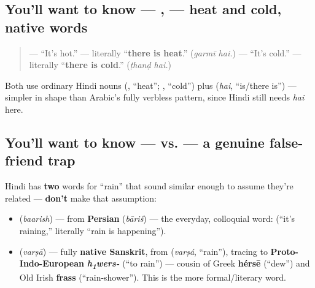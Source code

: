 \subsection*{You'll want to know —  ,   — heat and cold, native words}
\begin{quote}
\textbf{ } — \textquotedblleft{}It's hot.\textquotedblright{} — literally \textquotedblleft{}\textbf{there is heat}.\textquotedblright{} (\emph{garmī hai.}) \textbf{ } — \textquotedblleft{}It's cold.\textquotedblright{} — literally \textquotedblleft{}\textbf{there is cold}.\textquotedblright{} (\emph{ṭhanḍ hai.})
\end{quote}

Both use ordinary Hindi nouns (\textbf{}, \textquotedblleft{}heat\textquotedblright{}; \textbf{}, \textquotedblleft{}cold\textquotedblright{}) plus \textbf{} (\emph{hai}, \textquotedblleft{}is/there is\textquotedblright{}) — simpler in shape than Arabic's fully verbless pattern, since Hindi still needs \emph{hai} here.

\subsection*{You'll want to know —  vs.  — a genuine false-friend trap}
Hindi has \textbf{two} words for \textquotedblleft{}rain\textquotedblright{} that sound similar enough to assume they're related — \textbf{don't} make that assumption:

\begin{itemize}
\raggedright
  \item \textbf{} (\emph{baarish}) — from \textbf{Persian} \textbf{} (\emph{bāriš}) — the everyday, colloquial word: \textbf{   } (\textquotedblleft{}it's raining,\textquotedblright{} literally \textquotedblleft{}rain is happening\textquotedblright{}).
  \item \textbf{} (\emph{varṣā}) — fully \textbf{native Sanskrit}, from \textbf{} (\emph{varṣá}, \textquotedblleft{}rain\textquotedblright{}), tracing to \textbf{Proto-Indo-European} \emph{\textbf{h\textsubscript{1}wers-}} (\textquotedblleft{}to rain\textquotedblright{}) — cousin of Greek \textbf{hérsē} (\textquotedblleft{}dew\textquotedblright{}) and Old Irish \textbf{frass} (\textquotedblleft{}rain-shower\textquotedblright{}). This is the more formal/literary word.
\end{itemize}

